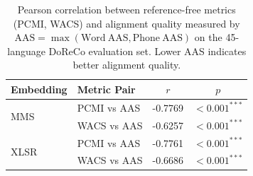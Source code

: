 \begin{table}[t]
\centering
\small
\begin{tabular}{llcc}
\toprule
\textbf{Embedding} & \textbf{Metric Pair} & \textbf{$r$} & \textbf{$p$} \\
\midrule
\multirow{2}{*}{MMS} & PCMI vs AAS & -0.7769 & $<0.001^{***}$ \\
& WACS vs AAS & -0.6257 & $<0.001^{***}$ \\
\midrule
\multirow{2}{*}{XLSR} & PCMI vs AAS & -0.7761 & $<0.001^{***}$ \\
& WACS vs AAS & -0.6686 & $<0.001^{***}$ \\
\bottomrule
\end{tabular}
\caption{Pearson correlation between reference-free metrics (PCMI, WACS) and alignment quality measured by $\mathrm{AAS}=\max(\mathrm{Word\ AAS},\mathrm{Phone\ AAS})$ on the 45-language DoReCo evaluation set. Lower AAS indicates better alignment quality.}
\label{tab:doreco_corr_aas}
\end{table}
